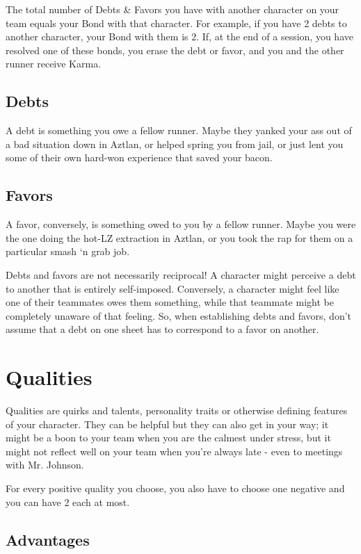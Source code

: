 The total number of Debts \& Favors you have with another character on your team equals your Bond with that character. For example, if you have 2 debts to another character, your Bond with them is 2. If, at the end of a session, you have resolved one of these bonds, you erase the debt or favor, and you and the other runner receive Karma.

\subsection{Debts}
A debt is something you owe a fellow runner. Maybe they yanked your ass out of a bad situation down in Aztlan, or helped spring you from jail, or just lent you some of their own hard-won experience that saved your bacon.

\subsection{Favors}
A favor, conversely, is something owed to you by a fellow runner. Maybe you were the one doing the hot-LZ extraction in Aztlan, or you took the rap for them on a particular smash ‘n grab job.

Debts and favors are not necessarily reciprocal! A character might perceive a debt to another that is entirely self-imposed. Conversely, a character might feel like one of their teammates owes them something, while that teammate might be completely unaware of that feeling. So, when establishing debts and favors, don’t assume that a debt on one sheet has to correspond to a favor on another.



\section{Qualities}

Qualities are quirks and talents, personality traits or otherwise defining features of your character. They can be helpful but they can also get in your way; it might be a boon to your team when you are the calmest under stress, but it might not reflect well on your team when you're always late - even to meetings with Mr. Johnson.

For every positive quality you choose, you also have to choose one negative and you can have 2 each at most. 

\subsection{Advantages}



